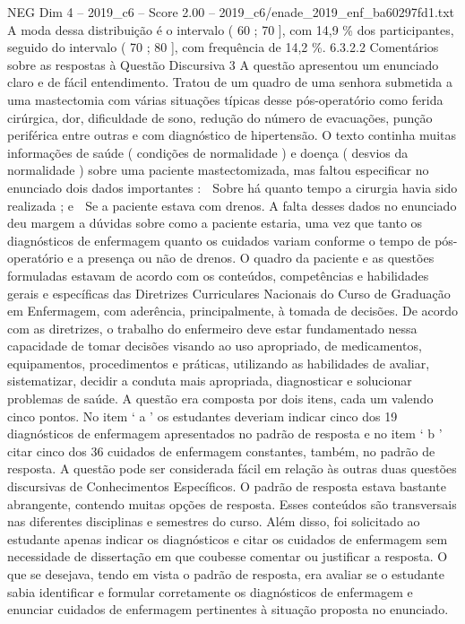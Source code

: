 \begin{textsample}{NEG Dim 4 – 2019\_c6 – Score 2.00 – 2019\_c6/enade\_2019\_enf\_ba60297fd1.txt}
A moda dessa distribuição é o intervalo ( 60 ; 70 ], com 14,9 \% dos participantes, seguido do intervalo ( 70 ; 80 ], com frequência de 14,2 \%. 6.3.2.2 Comentários sobre as respostas à Questão Discursiva 3 A questão apresentou um enunciado claro e de fácil entendimento.
Tratou de um quadro de uma senhora submetida a uma mastectomia com várias situações típicas desse pós-operatório como ferida cirúrgica, dor, dificuldade de sono, redução do número de evacuações, punção periférica entre outras e com diagnóstico de hipertensão.
O texto continha muitas informações de saúde ( condições de normalidade ) e doença ( desvios da normalidade ) sobre uma paciente mastectomizada, mas faltou especificar no enunciado dois dados importantes :  Sobre há quanto tempo a cirurgia havia sido realizada ; e  Se a paciente estava com drenos.
A falta desses dados no enunciado deu margem a dúvidas sobre como a paciente estaria, uma vez que tanto os diagnósticos de enfermagem quanto os cuidados variam conforme o tempo de pós-operatório e a presença ou não de drenos.
O quadro da paciente e as questões formuladas estavam de acordo com os conteúdos, competências e habilidades gerais e específicas das Diretrizes Curriculares Nacionais do Curso de Graduação em Enfermagem, com aderência, principalmente, à tomada de decisões.
De acordo com as diretrizes, o trabalho do enfermeiro deve estar fundamentado nessa capacidade de tomar decisões visando ao uso apropriado, de medicamentos, equipamentos, procedimentos e práticas, utilizando as habilidades de avaliar, sistematizar, decidir a conduta mais apropriada, diagnosticar e solucionar problemas de saúde.
A questão era composta por dois itens, cada um valendo cinco pontos.
No item ‘ a ’ os estudantes deveriam indicar cinco dos 19 diagnósticos de enfermagem apresentados no padrão de resposta e no item ‘ b ’ citar cinco dos 36 cuidados de enfermagem constantes, também, no padrão de resposta.
A questão pode ser considerada fácil em relação às outras duas questões discursivas de Conhecimentos Específicos.
O padrão de resposta estava bastante abrangente, contendo muitas opções de resposta.
Esses conteúdos são transversais nas diferentes disciplinas e semestres do curso.
Além disso, foi solicitado ao estudante apenas indicar os diagnósticos e citar os cuidados de enfermagem sem necessidade de dissertação em que coubesse comentar ou justificar a resposta.
O que se desejava, tendo em vista o padrão de resposta, era avaliar se o estudante sabia identificar e formular corretamente os diagnósticos de enfermagem e enunciar cuidados de enfermagem pertinentes à situação proposta no enunciado.

\end{textsample}
